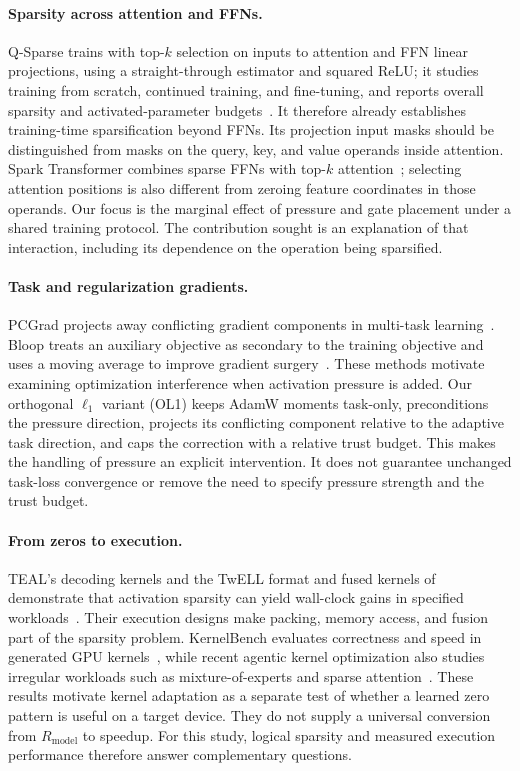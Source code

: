\paragraph{Sparsity across attention and FFNs.}
Q-Sparse trains with top-$k$ selection on inputs to attention and FFN linear
projections, using a straight-through estimator and squared ReLU; it studies
training from scratch, continued training, and fine-tuning, and reports overall
sparsity and activated-parameter budgets~\citep{wang2024qsparse}. It therefore
already establishes training-time sparsification beyond FFNs. Its projection
input masks should be distinguished from masks on the query, key, and value
operands inside attention. Spark Transformer combines sparse FFNs with
top-$k$ attention~\citep{you2025spark}; selecting attention positions is also
different from zeroing feature coordinates in those operands. Our focus is
the marginal effect of pressure and gate placement under a shared training
protocol. The contribution sought is an explanation of that interaction,
including its dependence on the operation being sparsified.

\paragraph{Task and regularization gradients.}
PCGrad projects away conflicting gradient components in multi-task
learning~\citep{yu2020pcgrad}. Bloop treats an auxiliary objective as secondary
to the training objective and uses a moving average to improve gradient
surgery~\citep{hsieh2024bloop}. These methods motivate examining optimization
interference when activation pressure is added. Our orthogonal $\ell_1$
variant (OL1) keeps AdamW moments task-only, preconditions the pressure
direction, projects its conflicting component relative to the adaptive task
direction, and caps the correction with a relative trust budget. This makes
the handling of pressure an explicit intervention. It does not guarantee
unchanged task-loss convergence or remove the need to specify pressure
strength and the trust budget.

\paragraph{From zeros to execution.}
TEAL's decoding kernels and the TwELL format and fused kernels of
\citet{cetin2026sparser} demonstrate that activation sparsity can yield
wall-clock gains in specified workloads~\citep{liu2024teal}. Their execution
designs make packing, memory access, and fusion part of the sparsity problem.
KernelBench evaluates correctness and speed in generated GPU
kernels~\citep{ouyang2025kernelbench}, while recent agentic kernel optimization
also studies irregular workloads such as mixture-of-experts and sparse
attention~\citep{luo2026agentic}. These results motivate kernel adaptation as
a separate test of whether a learned zero pattern is useful on a target
device. They do not supply a universal conversion from
$R_{\mathrm{model}}$ to speedup. For this study, logical sparsity and measured
execution performance therefore answer complementary questions.
